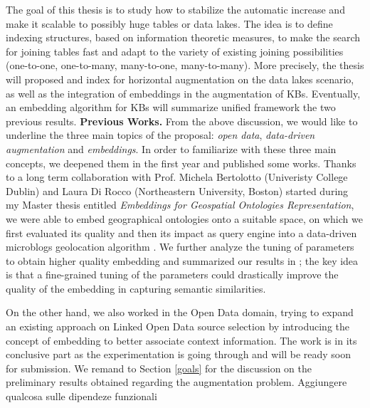 The goal of this thesis is to study how to stabilize the automatic increase and make it scalable to possibly huge tables or data lakes. The idea is to define indexing structures, based on information theoretic measures, to make the search for joining tables fast and adapt to the variety of existing joining possibilities (one-to-one, one-to-many, many-to-one, many-to-many). More precisely, the thesis will proposed and index for horizontal augmentation on the data lakes scenario, as well as the integration of embeddings in the augmentation of KBs. Eventually, an embedding algorithm for KBs will summarize unified framework the two previous results.
\bigbreak
\textbf{Previous Works.} From the above discussion, we would like to underline the three main topics of the proposal: \textit{open data}, \textit{data-driven augmentation} and \textit{embeddings}. In order to familiarize with these three main concepts, we deepened them in the first year and published some works. Thanks to a long term collaboration with Prof. Michela Bertolotto (Univeristy College Dublin) and Laura Di Rocco (Northeastern University, Boston) started during my Master thesis entitled \textit{Embeddings for Geospatial Ontologies Representation}, we were able to embed geographical ontologies onto a suitable space, on which we first evaluated its quality \cite{dassereto2019evaluating} and then its impact as query engine into a data-driven microblogs geolocation algorithm \cite{di2020sherloc}. We further analyze the tuning of parameters to obtain higher quality embedding and summarized our results in \cite{dassereto2020tuning}; the key idea is that a fine-grained tuning of the parameters could drastically improve the quality of the embedding in capturing semantic similarities.

On the other hand, we also worked in the Open Data domain, trying to expand an existing approach on Linked Open Data source selection \cite{beyza2019linked} by introducing the concept of embedding to better associate context information. The work is in its conclusive part as the experimentation is going through and will be ready soon for submission. We remand to Section \ref{goals} for the discussion on the preliminary results obtained regarding the augmentation problem.
\bigbreak
{\color{red}Aggiungere qualcosa sulle dipendeze funzionali}


